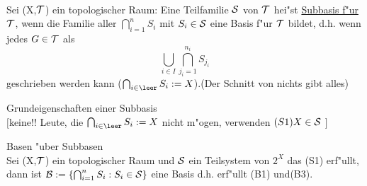 \begin{definition}\label{2.20}\\
Sei (X,$\mathcal T$) ein topologischer Raum: Eine Teilfamilie $\mathcal S$ von $\mathcal T$ hei"st \ul{Subbasis f"ur $\mathcal T$}, wenn die Familie aller $\bigcap_{i=1}^n S_i$ mit $S_i\in\mathcal S$ eine Basis f"ur $\mathcal T$ bildet, d.h. wenn jedes $G\in\mathcal T$ als
$$\bigcup_{i\in I}\bigcap_{j_i=1}^{n_i}S_{j_i}$$
geschrieben werden kann ($\bigcap_{i\in\leer}S_i:=X$).{\scriptsize (Der Schnitt von nichts gibt alles)}
\end{definition}

\begin{satz}\label{2.21}{\sc Grundeigenschaften einer Subbasis}\\
$[$keine!! Leute, die $\bigcap_{i\in\leer}S_i :=X$ nicht m"ogen, verwenden $(S1) X\in \mathcal S$ $]$
\end{satz}

\begin{satz}\label{2.22}{\sc Basen "uber Subbasen}\\
Sei (X,$\mathcal T$) ein topologischer Raum und $\mathcal S$ ein Teilsystem von $2^X$ das (S1) erf"ullt, dann ist $\mathcal B :=\{ \bigcap_{i=1}^n S_i : S_i\in\mathcal S \}$ eine Basis d.h. erf"ullt (B1) und(B3).
\end{satz}

